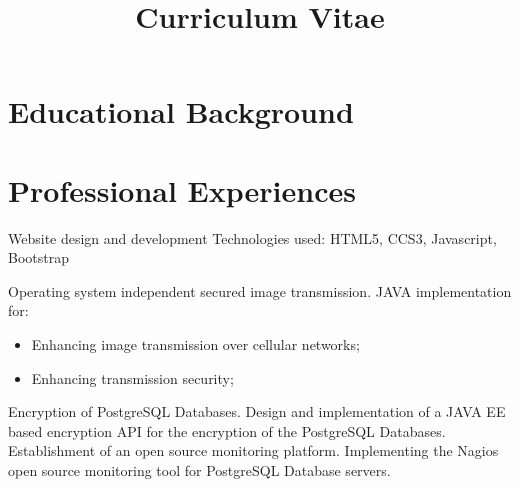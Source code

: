 \documentclass[11pt,a4paper,sans]{moderncv}        %
\title{Curriculum Vitae}                               %
\begin{document}
	\makecvtitle

	\section{Educational Background}


	\section{Professional Experiences}
				{Website design and development
				\newline{}
				Technologies used: HTML5, CCS3, Javascript, Bootstrap
				}
				{Operating system independent secured image transmission.\newline{}%
					JAVA implementation for:%
					\begin{itemize}%
						\item Enhancing image transmission over cellular networks;
						\item Enhancing transmission security;
					\end{itemize}
				}
				{Encryption of PostgreSQL Databases.
				\newline{}
				Design and implementation of a JAVA EE based encryption API for the encryption of the
					PostgreSQL Databases.
				}
				{Establishment of an open source monitoring platform. 
				\newline{}
				Implementing the Nagios open source monitoring tool for PostgreSQL Database servers.
				}
		
\end{document}
